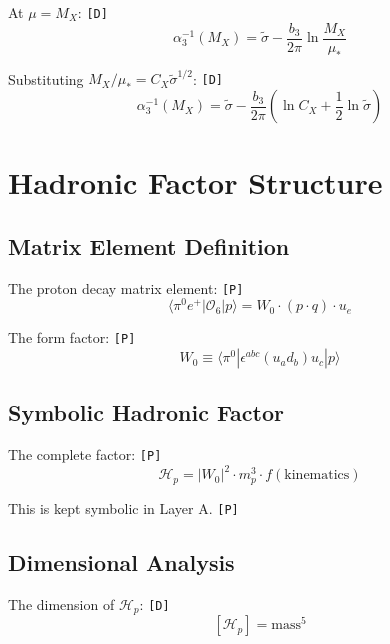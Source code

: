 \documentclass[11pt,a4paper]{article}
\newcommand{\tagD}{\textcolor{green!50!black}{\texttt{[D]}}}
\newcommand{\tagP}{\textcolor{orange!80!black}{\texttt{[P]}}}
\theoremstyle{definition}
\begin{document}
At $\mu = M_X$: \tagD{}
\begin{equation}
\label{eq:run-mx}
\alpha_3^{-1}(M_X) = \tilde{\sigma} - \frac{b_3}{2\pi}\ln\frac{M_X}{\mu_*}
\end{equation}

Substituting $M_X/\mu_* = C_X\tilde{\sigma}^{1/2}$: \tagD{}
\begin{equation}
\label{eq:run-subst}
\alpha_3^{-1}(M_X) = \tilde{\sigma} - \frac{b_3}{2\pi}\left(\ln C_X + \frac{1}{2}\ln\tilde{\sigma}\right)
\end{equation}

\section{Hadronic Factor Structure}
\label{app:hadronic-struct}

\subsection{Matrix Element Definition}
\label{app:me-def}

The proton decay matrix element: \tagP{}
\begin{equation}
\label{eq:me-def-1}
\langle \pi^0 e^+ | \mathcal{O}_6 | p \rangle = W_0 \cdot (p \cdot q) \cdot u_e
\end{equation}

The form factor: \tagP{}
\begin{equation}
\label{eq:me-def-2}
W_0 \equiv \langle \pi^0 | \epsilon^{abc}(u_a d_b) u_c | p \rangle
\end{equation}

\subsection{Symbolic Hadronic Factor}
\label{app:hp-sym}

The complete factor: \tagP{}
\begin{equation}
\label{eq:hp-sym}
\mathcal{H}_p = |W_0|^2 \cdot m_p^3 \cdot f(\text{kinematics})
\end{equation}

This is kept symbolic in Layer A. \tagP{}

\subsection{Dimensional Analysis}
\label{app:hp-dim}

The dimension of $\mathcal{H}_p$: \tagD{}
\begin{equation}
\label{eq:hp-dim}
[\mathcal{H}_p] = \text{mass}^5
\end{equation}
\end{document}
